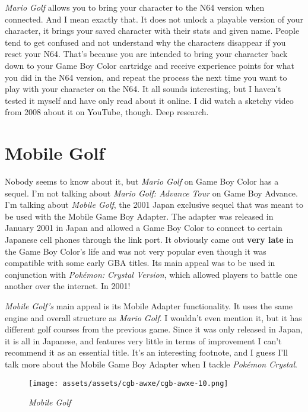 \documentclass{book}
\begin{document}
\emph{Mario Golf} allows you to bring your character to the N64 version when connected. And I mean exactly that. It does not unlock a playable version of your character, it brings your saved character with their stats and given name. People tend to get confused and not understand why the characters disappear if you reset your N64. That’s because you are intended to bring your character back down to your Game Boy Color cartridge and receive experience points for what you did in the N64 version, and repeat the process the next time you want to play with your character on the N64. It all sounds interesting, but I haven’t tested it myself and have only read about it online. I did watch a sketchy video from 2008 about it on YouTube, though. Deep research.

\FloatBarrier\needspace{10mm}\section*{Mobile Golf}\nopagebreak[4]

Nobody seems to know about it, but \emph{Mario Golf} on Game Boy Color has a sequel. I’m not talking about \emph{Mario Golf: Advance Tour} on Game Boy Advance. I’m talking about \emph{Mobile Golf}, the 2001 Japan exclusive sequel that was meant to be used with the Mobile Game Boy Adapter. The adapter was released in January 2001 in Japan and allowed a Game Boy Color to connect to certain Japanese cell phones through the link port. It obviously came out \textbf{very late} in the Game Boy Color’s life and was not very popular even though it was compatible with some early GBA titles. Its main appeal was to be used in conjunction with \emph{Pokémon: Crystal Version}, which allowed players to battle one another over the internet. In 2001!

\emph{Mobile Golf’s} main appeal is its Mobile Adapter functionality. It uses the same engine and overall structure as \emph{Mario Golf}. I wouldn’t even mention it, but it has different golf courses from the previous game. Since it was only released in Japan, it is all in Japanese, and features very little in terms of improvement I can’t recommend it as an essential title. It’s an interesting footnote, and I guess I’ll talk more about the Mobile Game Boy Adapter when I tackle \emph{Pokémon Crystal}.

\begin{figure}[hbt]
\vskip 10pt
\centering \texttt{[image: assets/assets/cgb-awxe/cgb-awxe-10.png]}\par\pagetwodescription \emph{Mobile Golf}
\vskip 6pt
\end{figure}
\end{document}
